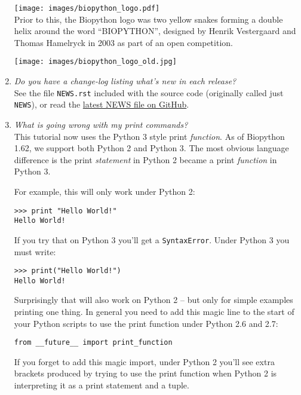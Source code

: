 \begin{enumerate}
  \texttt{[image: images/biopython\_logo.pdf]}\\

  Prior to this, the Biopython logo was two yellow snakes forming a double
  helix around the word ``BIOPYTHON'', designed by Henrik Vestergaard and
  Thomas Hamelryck in 2003 as part of an open competition.

  \texttt{[image: images/biopython\_logo\_old.jpg]}\\

  \item \emph{Do you have a change-log listing what's new in each release?} \\
  See the file \verb|NEWS.rst| included with the source code (originally called
  just \verb|NEWS|), or read the
  \href{https://github.com/biopython/biopython/blob/master/NEWS.rst}{latest NEWS file on GitHub}.

  \item \emph{What is going wrong with my print commands?} \\
  This tutorial now uses the Python 3 style print \emph{function}.
  As of Biopython 1.62, we support both Python 2 and Python 3.
  The most obvious language difference is the print \emph{statement}
  in Python 2 became a print \emph{function} in Python 3.

  For example, this will only work under Python 2:

\begin{verbatim}
>>> print "Hello World!"
Hello World!
\end{verbatim}

  If you try that on Python 3 you'll get a \verb|SyntaxError|.
  Under Python 3 you must write:

\begin{verbatim}
>>> print("Hello World!")
Hello World!
\end{verbatim}

  Surprisingly that will also work on Python 2 -- but only for simple
  examples printing one thing. In general you need to add this magic
  line to the start of your Python scripts to use the print function
  under Python 2.6 and 2.7:

\begin{verbatim}
from __future__ import print_function
\end{verbatim}

  If you forget to add this magic import, under Python 2 you'll see
  extra brackets produced by trying to use the print function when
  Python 2 is interpreting it as a print statement and a tuple.


\end{enumerate}
